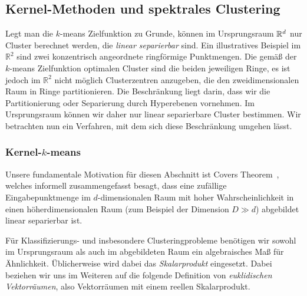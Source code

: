 \subsection{Kernel-Methoden und spektrales Clustering}
\label{subsection:basics:kernel-spectral}

Legt man die $k$-means Zielfunktion zu Grunde, können im Ursprungsraum $\mathbb{R}^{d}$ nur Cluster berechnet werden, die \emph{linear
separierbar} sind. Ein illustratives Beispiel im $\mathbb{R}^2$ sind zwei konzentrisch angeordnete ringförmige Punktmengen.
Die gemäß der $k$-means Zielfunktion optimalen Cluster sind die beiden jeweiligen Ringe, es ist jedoch im $\mathbb{R}^2$ nicht
möglich Clusterzentren anzugeben, die den zweidimensionalen Raum in Ringe partitionieren. Die Beschränkung liegt darin, dass
wir die Partitionierung oder Separierung durch Hyperebenen vornehmen. Im Ursprungsraum können wir daher nur linear separierbare
Cluster bestimmen. Wir betrachten nun ein Verfahren, mit dem sich diese Beschränkung umgehen lässt.

\subsubsection{Kernel-\texorpdfstring{$k$}{k}-means}

Unsere fundamentale Motivation für diesen Abschnitt ist Covers Theorem~\cite{Cover65}, welches informell zusammengefasst besagt,
dass eine zufällige Eingabepunktmenge im $d$-dimensionalen Raum mit hoher Wahrscheinlichkeit in einen höherdimensionalen
Raum (zum Beispiel der Dimension $D \gg d$) abgebildet linear separierbar ist.

Für Klassifizierungs- und insbesondere Clusteringprobleme benötigen wir sowohl im Ursprungsraum als auch im abgebildeten Raum
ein algebraisches Maß für Ähnlichkeit. Üblicherweise wird dabei das \emph{Skalarprodukt} eingesetzt. Dabei beziehen wir uns
im Weiteren auf die folgende Definition von \emph{euklidischen Vektorräumen}, also Vektorräumen mit einem reellen
Skalarprodukt.

